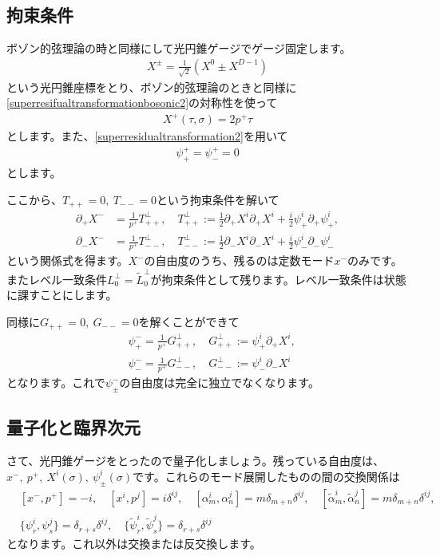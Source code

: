 \documentclass[report,paper=a4, fontsize=12pt, line_length=16cm, number_of_lines=34,dvipdfmx]{jlreq}
\numberwithin{equation}{chapter}
\numberwithin{equation}{section}
\newcommand{\del}{\partial}
\newcommand{\alphat}{\tilde{\alpha}}
\newcommand{\Lt}{\widetilde{L}}
\newcommand{\psit}{\tilde{\psi}}
\begin{document}
\subsection{拘束条件}
ボゾン的弦理論の時と同様にして光円錐ゲージでゲージ固定します。
\begin{align}
  X^{\pm}=\frac{1}{\sqrt{2}}(X^{0}\pm X^{D-1})
\end{align}
という光円錐座標をとり、ボゾン的弦理論のときと同様に\eqref{superresifualtransformationbosonic2}の対称性を使って
\begin{align}
  X^{+}(\tau,\sigma)=2p^{+} \tau
\end{align}
とします。また、\eqref{superresidualtransformation2}を用いて
\begin{align}
  \psi^{+}_{+}=\psi^{+}_{-}=0
\end{align}
とします。

ここから、$T_{++}=0,\ T_{--}=0$という拘束条件を解いて
\begin{align}
  \del_{+}X^{-}&=\frac{1}{p^{+}}T^{\perp}_{++},\quad T^{\perp}_{++}:=\frac12\del_{+}X^{i}\del_{+}X^{i}+\frac{i}{2}\psi^{i}_{+}\del_{+}\psi^{i}_{+},\label{alpha-zeromode}\\
  \del_{-}X^{-}&=\frac{1}{p^{+}}T^{\perp}_{--},\quad T^{\perp}_{--}:=\frac12\del_{-}X^{i}\del_{-}X^{i}+\frac{i}{2}\psi^{i}_{-}\del_{-}\psi^{i}_{-}
  \label{alphatilde-zeromode}
\end{align}
という関係式を得ます。$X^{-}$の自由度のうち、残るのは定数モード$x^{-}$のみです。またレベル一致条件$L^{\perp}_0=\Lt^{\perp}_0$が拘束条件として残ります。レベル一致条件は状態に課すことにします。

同様に$G_{++}=0,\ G_{--}=0$を解くことができて
\begin{align}
  &\psi_{+}^{-}=\frac{1}{p^+}G^{\perp}_{++},\quad G^{\perp}_{++}:=\psi^{i}_{+}\del_{+}X^{i},\\
  &\psi_{-}^{-}=\frac{1}{p^+}G^{\perp}_{--},\quad G^{\perp}_{--}:=\psi^{i}_{-}\del_{-}X^{i}
\end{align}
となります。これで$\psi_{\pm}^{-}$の自由度は完全に独立でなくなります。

\subsection{量子化と臨界次元}
さて、光円錐ゲージをとったので量子化しましょう。残っている自由度は、$x^{-},\ p^{+},\ X^{i}(\sigma),\ \psi^{i}_{\pm}(\sigma)$です。これらのモード展開したものの間の交換関係は
\begin{align}
  &[x^{-},p^{+}]=-i,\quad[x^{i},p^{j}]=i\delta^{ij},\quad
  [\alpha_{m}^{i},\alpha_{n}^{j}]=m\delta_{m+n}\delta^{ij},\quad
  [\alphat_{m}^{i},\alphat_{n}^{j}]=m\delta_{m+n}\delta^{ij},\nonumber\\
  &\{\psi^{i}_{r},\psi^{j}_{s}\}=\delta_{r+s}\delta^{ij},\quad
  \{\psit^{i}_{r},\psit^{j}_{s}\}=\delta_{r+s}\delta^{ij}
\end{align}
となります。これ以外は交換または反交換します。
\end{document}
